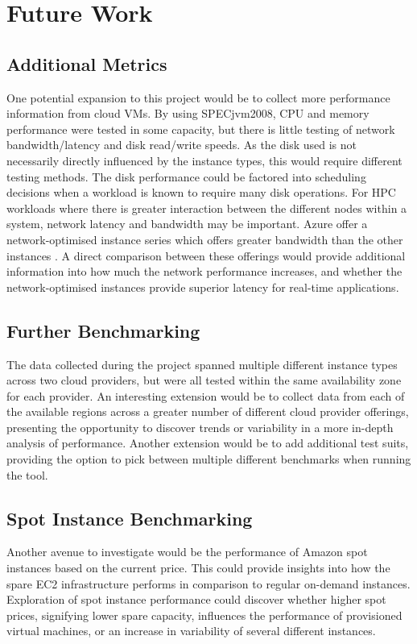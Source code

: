 \documentclass[conference]{IEEEtran}
\begin{document}

\section{Future Work}

\subsection{Additional Metrics}
One potential expansion to this project would be to collect more performance information from cloud VMs. By using SPECjvm2008, CPU and memory performance were tested in some capacity, but there is little testing of network bandwidth/latency and disk read/write speeds. As the disk used is not necessarily directly influenced by the instance types, this would require different testing methods. The disk performance could be factored into scheduling decisions when a workload is known to require many disk operations. For HPC workloads where there is greater interaction between the different nodes within a system, network latency and bandwidth may be important. Azure offer a network-optimised instance series which offers greater bandwidth than the other instances \cite{azurevmtype}. A direct comparison between these offerings would provide additional information into how much the network performance increases, and whether the network-optimised instances provide superior latency for real-time applications.

\subsection{Further Benchmarking}
The data collected during the project spanned multiple different instance types across two cloud providers, but were all tested within the same availability zone for each provider. An interesting extension would be to collect data from each of the available regions across a greater number of different cloud provider offerings, presenting the opportunity to discover trends or variability in a more in-depth analysis of performance. Another extension would be to add additional test suits, providing the option to pick between multiple different benchmarks when running the tool.

\subsection{Spot Instance Benchmarking}
Another avenue to investigate would be the performance of Amazon spot instances based on the current price. This could provide insights into how the spare EC2 infrastructure performs in comparison to regular on-demand instances. Exploration of spot instance performance could discover whether higher spot prices, signifying lower spare capacity, influences the performance of provisioned virtual machines, or an increase in variability of several different instances.
\end{document}
